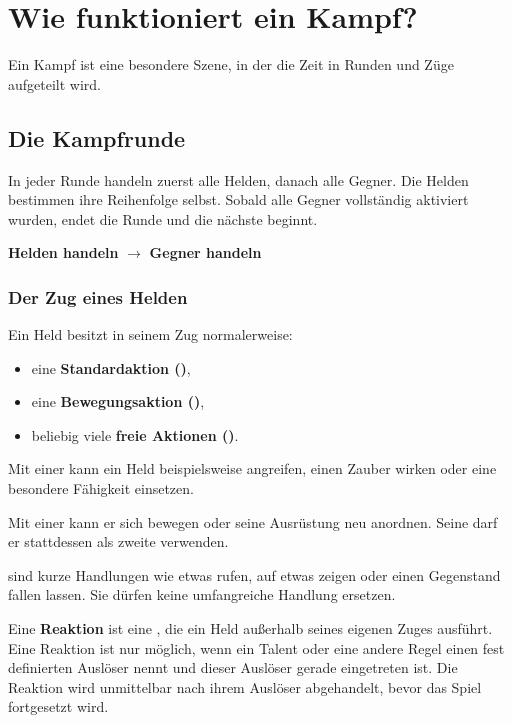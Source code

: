 \chapter{Wie funktioniert ein Kampf?}
\label{chap:combat}

Ein Kampf ist eine besondere Szene, in der die Zeit in Runden und Züge aufgeteilt wird.

\section{Die Kampfrunde}

In jeder Runde handeln zuerst alle Helden, danach alle Gegner. Die Helden bestimmen ihre Reihenfolge selbst. Sobald alle Gegner vollständig aktiviert wurden, endet die Runde und die nächste beginnt.

\begin{kurzregel}[title=Reihenfolge einer Kampfrunde]
\textbf{Helden handeln} $\rightarrow$ \textbf{Gegner handeln}
\end{kurzregel}

\subsection{Der Zug eines Helden}

Ein Held besitzt in seinem Zug normalerweise:

\begin{itemize}
  \item eine \textbf{Standardaktion (\standardAction)},
  \item eine \textbf{Bewegungsaktion (\moveAction)},
  \item beliebig viele \textbf{freie Aktionen (\freeAction)}.
\end{itemize}

Mit einer \standardAction{} kann ein Held beispielsweise angreifen, einen Zauber wirken oder eine besondere Fähigkeit einsetzen.

Mit einer \moveAction{} kann er sich bewegen oder seine Ausrüstung neu anordnen. Seine \standardAction{} darf er stattdessen als zweite \moveAction{} verwenden.

\freeAction{} sind kurze Handlungen wie etwas rufen, auf etwas zeigen oder einen Gegenstand fallen lassen. Sie dürfen keine umfangreiche Handlung ersetzen.

Eine \textbf{Reaktion} ist eine \freeAction{}, die ein Held außerhalb seines eigenen Zuges ausführt. Eine Reaktion ist nur möglich, wenn ein Talent oder eine andere Regel einen fest definierten Auslöser nennt und dieser Auslöser gerade eingetreten ist. Die Reaktion wird unmittelbar nach ihrem Auslöser abgehandelt, bevor das Spiel fortgesetzt wird.

